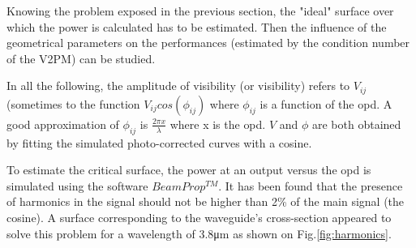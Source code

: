 Knowing the problem exposed in the previous section, the "ideal" surface over which the power is calculated has to be estimated. Then the influence of the geometrical parameters on the performances (estimated by the condition number of the \gls{V2PM}) can be studied. 

In all the following, the amplitude of visibility (or visibility) refers to $V_{ij}$ (sometimes to the function $V_{ij}cos(\phi_{ij})$ where $\phi_{ij}$ is a function of the \gls{opd}. A good approximation of $\phi_{ij}$ is $\frac{2\pi x}{\lambda}$ where x is the \gls{opd}. $V$ and $\phi$ are both obtained by fitting the simulated photo-corrected curves with a cosine.


To estimate the critical surface, the power at an output versus the \gls{opd} is simulated using the software $BeamProp^{TM}$. It has been found that the presence of harmonics in the signal should not be higher than 2\% of the main signal (the cosine). A surface corresponding to the waveguide's cross-section appeared to solve this problem for a wavelength of 3.8\si{\micro\meter} as shown on Fig.\ref{fig:harmonics}.   


